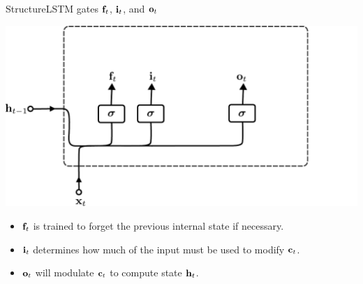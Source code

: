 \documentclass{beamer}
\begin{document}
\begin{frame}{Structure}{LSTM gates ${\bf f}_t$, ${\bf i}_t$, and ${\bf o}_t$}
\begin{center}
 \includegraphics[scale=0.4]{Module 5 (RNN)/pics/LSTM_gates.pdf}
 \end{center}
 \begin{itemize}
     \item ${\bf f}_t$ is trained to forget the previous internal state if necessary. 
     \item ${\bf i}_t$ determines how much of the input must be used to modify ${\bf c}_t$. 
     \item ${\bf o}_t$  will modulate ${\bf c}_t$ to compute state ${\bf h}_t$.
 \end{itemize}
\end{frame}
\end{document}

